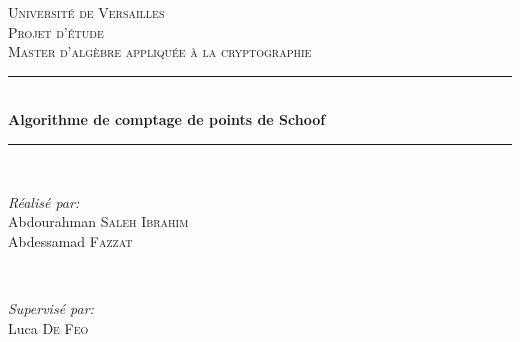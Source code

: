 \documentclass[12pt]{article}
\begin{document}
\begin{titlepage}

\newcommand{\HRule}{\rule{\linewidth}{0.5mm}} %

\center %
 

\textsc{\LARGE Université de Versailles}\\[1.5cm] %
\textsc{\Large Projet d'étude }\\[0.5cm] %
\textsc{\large Master d'algèbre appliquée à la cryptographie}\\[0.5cm] %


\HRule \\[0.4cm]
{ \huge \bfseries Algorithme de comptage de points de Schoof}\\[0.1cm] %
\HRule \\[1.5cm]
 

\begin{minipage}{0.5\textwidth}
\begin{flushleft} 
\emph{Réalisé par:}\\
Abdourahman \textsc{Saleh Ibrahim}\\
Abdessamad \textsc{Fazzat} %

\end{flushleft}
\end{minipage}
~
\begin{minipage}{0.4\textwidth}
\begin{flushright} 
\emph{Supervisé par:} \\
Luca \textsc{De Feo} %
\end{flushright}
\end{minipage}\\[2cm]


\end{titlepage}
\end{document}
